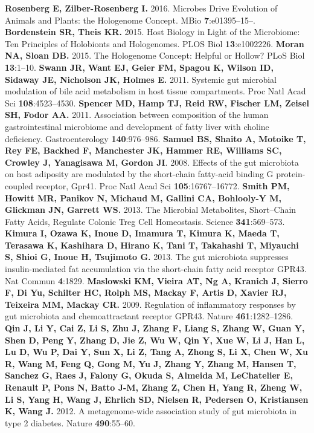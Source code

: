 \documentclass[12pt,oneside,letterpaper]{article}
\begin{document}
\begin{thebibliography}{99}
 {\bf Rosenberg E, Zilber-Rosenberg I.} 2016. Microbes Drive Evolution of Animals and Plants: the Hologenome Concept. MBio {\bf 7}:e01395–15–.
 {\bf Bordenstein SR, Theis KR.} 2015. Host Biology in Light of the Microbiome: Ten Principles of Holobionts and Hologenomes. PLOS Biol {\bf 13}:e1002226.
 {\bf Moran NA, Sloan DB.} 2015. The Hologenome Concept: Helpful or Hollow? PLoS Biol {\bf 13}:1–10.
 {\bf Swann JR, Want EJ, Geier FM, Spagou K, Wilson ID, Sidaway JE, Nicholson JK, Holmes E.} 2011. Systemic gut microbial modulation of bile acid metabolism in host tissue compartments. Proc Natl Acad Sci {\bf 108}:4523–4530.
 {\bf Spencer MD, Hamp TJ, Reid RW, Fischer LM, Zeisel SH, Fodor AA.} 2011. Association between composition of the human gastrointestinal microbiome and development of fatty liver with choline deficiency. Gastroenterology {\bf 140}:976–986.
 {\bf Samuel BS, Shaito A, Motoike T, Rey FE, Backhed F, Manchester JK, Hammer RE, Williams SC, Crowley J, Yanagisawa M, Gordon JI}. 2008. Effects of the gut microbiota on host adiposity are modulated by the short-chain fatty-acid binding G protein-coupled receptor, Gpr41. Proc Natl Acad Sci {\bf 105}:16767–16772.
 {\bf Smith PM, Howitt MR, Panikov N, Michaud M, Gallini CA, Bohlooly-Y M, Glickman JN, Garrett WS.} 2013. The Microbial Metabolites, Short--Chain Fatty Acids, Regulate Colonic Treg Cell Homeostasis. Science {\bf 341}:569–573.
 {\bf Kimura I, Ozawa K, Inoue D, Imamura T, Kimura K, Maeda T, Terasawa K, Kashihara D, Hirano K, Tani T, Takahashi T, Miyauchi S, Shioi G, Inoue H, Tsujimoto G.} 2013. The gut microbiota suppresses insulin-mediated fat accumulation via the short-chain fatty acid receptor GPR43. Nat Commun {\bf 4}:1829.
 {\bf Maslowski KM, Vieira AT, Ng A, Kranich J, Sierro F, Di Yu, Schilter HC, Rolph MS, Mackay F, Artis D, Xavier RJ, Teixeira MM, Mackay CR.} 2009. Regulation of inflammatory responses by gut microbiota and chemoattractant receptor GPR43. Nature {\bf 461}:1282–1286.
 {\bf Qin J, Li Y, Cai Z, Li S, Zhu J, Zhang F, Liang S, Zhang W, Guan Y, Shen D, Peng Y, Zhang D, Jie Z, Wu W, Qin Y, Xue W, Li J, Han L, Lu D, Wu P, Dai Y, Sun X, Li Z, Tang A, Zhong S, Li X, Chen W, Xu R, Wang M, Feng Q, Gong M, Yu J, Zhang Y, Zhang M, Hansen T, Sanchez G, Raes J, Falony G, Okuda S, Almeida M, LeChatelier E, Renault P, Pons N, Batto J-M, Zhang Z, Chen H, Yang R, Zheng W, Li S, Yang H, Wang J, Ehrlich SD, Nielsen R, Pedersen O, Kristiansen K, Wang J.} 2012. A metagenome-wide association study of gut microbiota in type 2 diabetes. Nature {\bf 490}:55–60.

\end{thebibliography}
\end{document}
